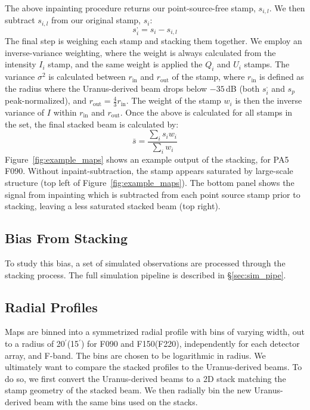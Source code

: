 The above inpainting procedure returns our point-source-free stamp, $s_{i,l}$.  We then subtract $s_{i,l}$ from our original stamp, $s_i$:
\begin{equation}
    s_i^{,} = s_i - s_{i,l}
\end{equation}
The final step is weighing each stamp and stacking them together.  We employ an inverse-variance weighting, where the weight is always calculated from the intensity $I_i$ stamp, and the same weight is applied the $Q_i$ and $U_i$ stamps.  The variance $\sigma^2$ is calculated between $r_{\text{in}}$ and $r_{\text{out}}$ of the stamp, where $r_{\text{in}}$ is defined as the radius where the Uranus-derived beam drops below $-35$\,dB (both $s_i^{,}$ and $s_p$ peak-normalized), and $r_{\text{out}}=\frac{4}{3}r_{\text{in}}$.  The weight of the stamp $w_i$ is then the inverse variance of $I$ within $r_{\text{in}}$ and $r_{\text{out}}$.  Once the above is calculated for all stamps in the set, the final stacked beam is calculated by:
\begin{equation}
    \bar{s} = \frac{\sum_i s_i w_i }{\sum_i w_i}
\end{equation}
Figure~\ref{fig:example_maps} shows an example output of the stacking, for PA5 F090.  Without inpaint-subtraction, the stamp appears saturated by large-scale structure (top left of Figure~\ref{fig:example_maps}).  The bottom panel shows the signal from inpainting which is subtracted from each point source stamp prior to stacking, leaving a less saturated stacked beam (top right).

\subsection{Bias From Stacking}
\label{subsec:bias}
To study this bias, a set of simulated observations are processed through the stacking process.  The full simulation pipeline is described in \S\ref{sec:sim_pipe}.

\subsection{Radial Profiles}
\label{subsec:profs}
Maps are binned into a symmetrized radial profile with bins of varying width, out to a radius of 20$^{\prime}$(15$^{\prime}$) for F090 and F150(F220), independently for each detector array, and F-band.  The bins are chosen to be logarithmic in radius.  We ultimately want to compare the stacked profiles to the Uranus-derived beams.  To do so, we first convert the Uranus-derived beams to a 2D stack matching the stamp geometry of the stacked beam.  We then radially bin the new Uranus-derived beam with the same bins used on the stacks.

